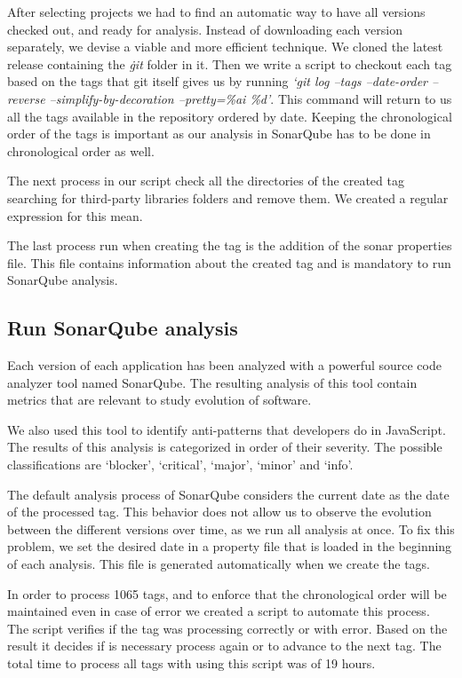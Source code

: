 After selecting projects we had to find an automatic way to have all versions checked out, and ready for analysis. Instead of downloading each version separately, we devise a viable and more efficient technique. We cloned the latest release containing the \textit{\.git} folder in it. Then we write a script to checkout each tag based on the tags that git itself gives us by running \textit{`git log --tags --date-order --reverse --simplify-by-decoration --pretty=\%ai \%d'}. This command will return to us all the tags available in the repository ordered by date. Keeping the chronological order of the tags is important as our analysis in SonarQube has to be done in chronological order as well. 

The next process in our script check all the directories of the created tag searching for third-party libraries folders and remove them. We created a regular expression for this mean. 

The last process run when creating the tag is the addition of the sonar properties file. This file contains information about the created tag and is mandatory to run SonarQube analysis.


\subsection{Run SonarQube analysis}

\par
Each version of each application has been analyzed with a powerful source code analyzer tool named SonarQube. The resulting analysis of this tool contain metrics that are relevant to study evolution of software. 
\par
We also used this tool to identify anti-patterns that developers do in JavaScript. The results of this analysis is categorized in order of their severity. The possible classifications are `blocker', `critical', `major', `minor' and `info'.
\par
The default analysis process of SonarQube considers the current date as the date of the processed tag. This behavior does not allow us to observe the evolution between the different versions over time, as we run all analysis at once. To fix this problem, we set the desired date in a property file that is loaded in the beginning of each analysis. This file is generated automatically when we create the tags. 

In order to process 1065 tags, and to enforce that the chronological order will be maintained even in case of error we created a script to automate this process.
The script verifies if the tag was processing correctly or with error. Based on the result it decides if is necessary process again or to advance to the next tag. The total time to  process all tags with using this script was of 19 hours.

